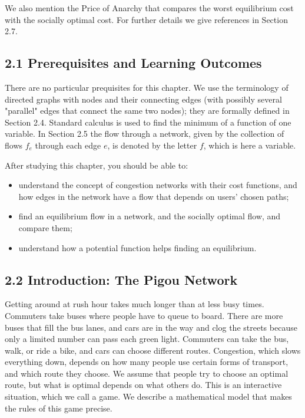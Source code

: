 \documentclass[12pt]{article}
\begin{document}
We also mention the Price of Anarchy that compares the worst equilibrium cost with the socially optimal cost. For further details we give references in Section 2.7.

\subsection*{2.1 Prerequisites and Learning Outcomes}
There are no particular prequisites for this chapter. We use the terminology of directed graphs with nodes and their connecting edges (with possibly several "parallel" edges that connect the same two nodes); they are formally defined in Section 2.4. Standard calculus is used to find the minimum of a function of one variable. In Section 2.5 the flow through a network, given by the collection of flows $f_{e}$ through each edge $e$, is denoted by the letter $f$, which is here a variable.

After studying this chapter, you should be able to:

\begin{itemize}
  \item understand the concept of congestion networks with their cost functions, and how edges in the network have a flow that depends on users' chosen paths;
  \item find an equilibrium flow in a network, and the socially optimal flow, and compare them;
  \item understand how a potential function helps finding an equilibrium.
\end{itemize}

\subsection*{2.2 Introduction: The Pigou Network}
Getting around at rush hour takes much longer than at less busy times. Commuters take buses where people have to queue to board. There are more buses that fill the bus lanes, and cars are in the way and clog the streets because only a limited number can pass each green light. Commuters can take the bus, walk, or ride a bike, and cars can choose different routes. Congestion, which slows everything down, depends on how many people use certain forms of transport, and which route they choose. We assume that people try to choose an optimal route, but what is optimal depends on what others do. This is an interactive situation, which we call a game. We describe a mathematical model that makes the rules of this game precise.
\end{document}
